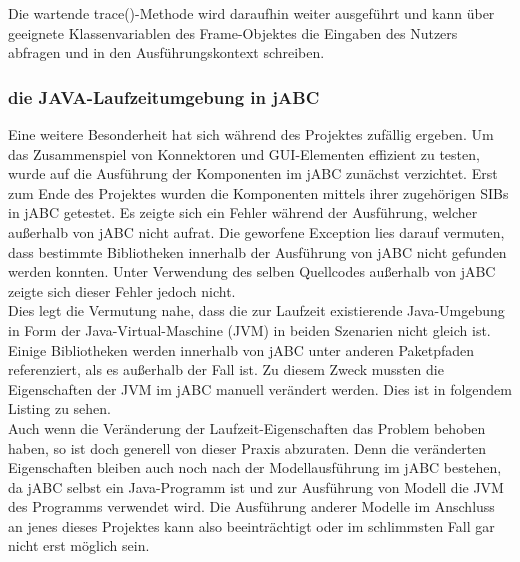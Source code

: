 Die wartende trace()-Methode wird daraufhin weiter ausgeführt und kann über geeignete Klassenvariablen des Frame-Objektes die Eingaben des Nutzers abfragen und in den Ausführungskontext schreiben.

\subsubsection{die JAVA-Laufzeitumgebung in jABC}	
Eine weitere Besonderheit hat sich während des Projektes zufällig ergeben. Um das Zusammenspiel von Konnektoren und GUI-Elementen effizient zu testen, wurde auf die Ausführung der Komponenten im jABC zunächst verzichtet. Erst zum Ende des Projektes wurden die Komponenten mittels ihrer zugehörigen SIBs in jABC getestet. Es zeigte sich ein Fehler während der Ausführung, welcher außerhalb von jABC nicht aufrat. Die geworfene Exception lies darauf vermuten, dass bestimmte Bibliotheken innerhalb der Ausführung von jABC nicht gefunden werden konnten. Unter Verwendung des selben Quellcodes außerhalb von jABC zeigte sich dieser Fehler jedoch nicht.\\
Dies legt die Vermutung nahe, dass die zur Laufzeit existierende Java-Umgebung in Form der Java-Virtual-Maschine (JVM) in beiden Szenarien nicht gleich ist. Einige Bibliotheken werden innerhalb von jABC unter anderen Paketpfaden referenziert, als es außerhalb der Fall ist. Zu diesem Zweck mussten die Eigenschaften der JVM im jABC manuell verändert werden. Dies ist in folgendem Listing zu sehen.\\


Auch wenn die Veränderung der Laufzeit-Eigenschaften das Problem behoben haben, so ist doch generell von dieser Praxis abzuraten. Denn die veränderten Eigenschaften bleiben auch noch nach der Modellausführung im jABC bestehen, da jABC selbst ein Java-Programm ist und zur Ausführung von Modell die JVM des Programms verwendet wird. Die Ausführung anderer Modelle im Anschluss an jenes dieses Projektes kann also beeinträchtigt oder im schlimmsten Fall gar nicht erst möglich sein.


